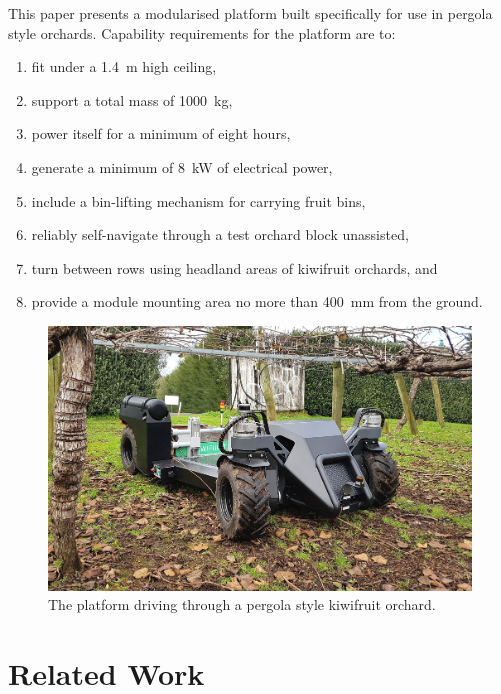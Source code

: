 \documentclass[preprint,authoryear,12pt]{elsarticle}
\begin{document}
    This paper presents a modularised platform built specifically for use in pergola style orchards.
    Capability requirements for the platform are to:
    \begin{enumerate}
        \item fit under a \SI{1.4}{\meter} high ceiling,
        \item support a total mass of \SI{1000}{\kilo\gram},
        \item power itself for a minimum of eight hours,
        \item generate a minimum of \SI{8}{\kilo\watt} of electrical power,
        \item include a bin-lifting mechanism for carrying fruit bins,
        \item reliably self-navigate through a test orchard block unassisted,
        \item turn between rows using headland areas of kiwifruit orchards, and
        \item provide a module mounting area no more than \SI{400}{\milli\meter} from the ground.
    \end{enumerate}
    \begin{figure}[htb]
        \centering
        \includegraphics[width=\linewidth]{imgs/photos/suzy_general.jpg}
        \caption{
            The platform driving through a pergola style kiwifruit orchard.
        }
        \label{fig:suzy}
    \end{figure}


\section{Related Work}
\label{sect:review}
\end{document}

